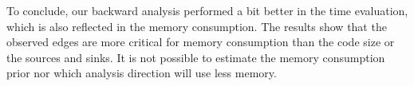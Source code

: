 \documentclass[../draft.tex]{subfiles}
\begin{document}
    To conclude, our backward analysis performed a bit better in the time evaluation, which is also reflected in the memory consumption. The results show that the observed edges are more critical for memory consumption than the code size or the sources and sinks. It is not possible to estimate the memory consumption prior nor which analysis direction will use less memory.


    \FloatBarrier
\end{document}
